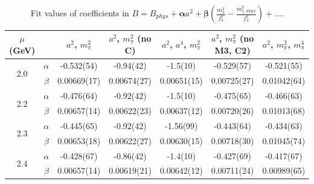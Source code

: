 \documentclass[12pt]{extarticle}
\begin{document}
\begin{table}[h!]
\begin{center}
\begin{tabular}{|c c|c|c|c|c|c|}
\hline
$\mu$ (GeV) &  & $a^2$, $m_\pi^2$& $a^2$, $m_\pi^2$ (no C)& $a^2$, $a^4$, $m_\pi^2$& $a^2$, $m_\pi^2$ (no M3, C2)& $a^2$, $m_\pi^2$, $m_\pi^4$\\
\hline
\multirow{2}{0.5in}{2.0} & $\alpha$ & -0.532(54)& -0.94(42)& -1.5(10)& -0.529(57)& -0.521(55)\\
 & $\beta$ & 0.00669(17)& 0.00674(27)& 0.00651(15)& 0.00725(27)& 0.01042(64)\\
\hline
\multirow{2}{0.5in}{2.2} & $\alpha$ & -0.476(64)& -0.92(42)& -1.5(10)& -0.475(65)& -0.466(63)\\
 & $\beta$ & 0.00657(14)& 0.00622(23)& 0.00637(12)& 0.00720(26)& 0.01013(68)\\
\hline
\multirow{2}{0.5in}{2.3} & $\alpha$ & -0.445(65)& -0.92(42)& -1.56(99)& -0.443(64)& -0.434(63)\\
 & $\beta$ & 0.00653(18)& 0.00622(27)& 0.00630(15)& 0.00718(30)& 0.01045(74)\\
\hline
\multirow{2}{0.5in}{2.4} & $\alpha$ & -0.428(67)& -0.86(42)& -1.4(10)& -0.427(69)& -0.417(67)\\
 & $\beta$ & 0.00657(14)& 0.00619(21)& 0.00642(12)& 0.00711(24)& 0.00989(65)\\
\hline
\end{tabular}
\caption{Fit values of coefficients in $B = B_{phys} + \mathbf{\alpha} a^2 + \mathbf{\beta}\left(\frac{m_\pi^2}{f_\pi^2}-\frac{m_{\pi,PDG}^2}{f_\pi^2}\right) + \ldots$.}
\end{center}
\end{table}




















\clearpage
\end{document}

